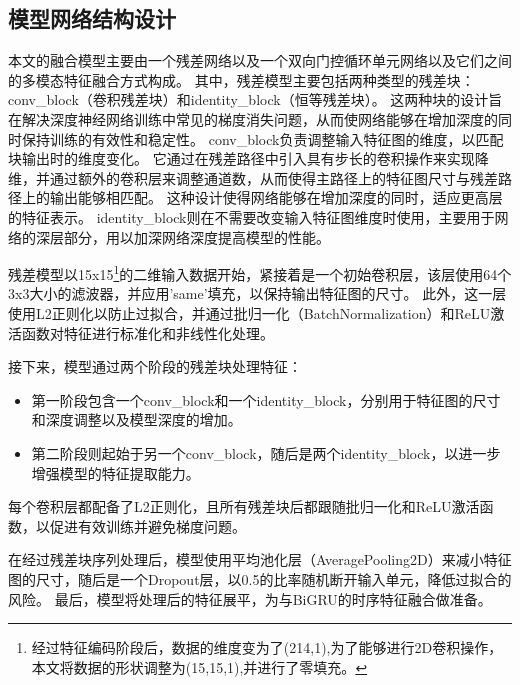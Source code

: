 \subsection{模型网络结构设计}
本文的融合模型主要由一个残差网络以及一个双向门控循环单元网络以及它们之间的多模态特征融合方式构成。
其中，残差模型主要包括两种类型的残差块：conv\_block（卷积残差块）和identity\_block（恒等残差块）。
这两种块的设计旨在解决深度神经网络训练中常见的梯度消失问题，从而使网络能够在增加深度的同时保持训练的有效性和稳定性。
conv\_block负责调整输入特征图的维度，以匹配块输出时的维度变化。
它通过在残差路径中引入具有步长的卷积操作来实现降维，并通过额外的卷积层来调整通道数，从而使得主路径上的特征图尺寸与残差路径上的输出能够相匹配。
这种设计使得网络能够在增加深度的同时，适应更高层的特征表示。
identity\_block则在不需要改变输入特征图维度时使用，主要用于网络的深层部分，用以加深网络深度提高模型的性能。\par

残差模型以15x15\footnote{经过特征编码阶段后，数据的维度变为了(214,1),为了能够进行2D卷积操作，本文将数据的形状调整为(15,15,1),并进行了零填充。}的二维输入数据开始，紧接着是一个初始卷积层，该层使用64个3x3大小的滤波器，并应用’same’填充，以保持输出特征图的尺寸。
此外，这一层使用L2正则化以防止过拟合，并通过批归一化（BatchNormalization）和ReLU激活函数对特征进行标准化和非线性化处理。

接下来，模型通过两个阶段的残差块处理特征：

\begin{itemize}
  \item 第一阶段包含一个conv\_block和一个identity\_block，分别用于特征图的尺寸和深度调整以及模型深度的增加。
  \item 第二阶段则起始于另一个conv\_block，随后是两个identity\_block，以进一步增强模型的特征提取能力。
\end{itemize}
每个卷积层都配备了L2正则化，且所有残差块后都跟随批归一化和ReLU激活函数，以促进有效训练并避免梯度问题。

在经过残差块序列处理后，模型使用平均池化层（AveragePooling2D）来减小特征图的尺寸，随后是一个Dropout层，以0.5的比率随机断开输入单元，降低过拟合的风险。
最后，模型将处理后的特征展平，为与BiGRU的时序特征融合做准备。


